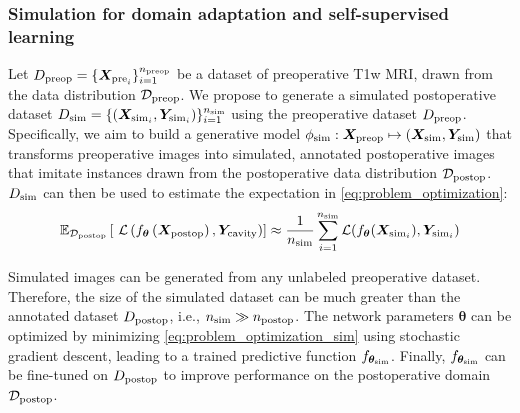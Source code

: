 \subsubsection{Simulation for domain adaptation and self-supervised learning}
\label{sec:sim_res_self}

Let $D_{\textnormal{preop}} = \{ \bm{X}_{\text{pre}_i} \}_{i = 1}^{n_{\textnormal{preop}}}$ be a dataset of preoperative \ac{T1w} \ac{MRI}, drawn from the data distribution $\mathcal{D}_{\textnormal{preop}}$.
We propose to generate a simulated postoperative dataset $D_{\textnormal{sim}} = \{ (\bm{X}_{\text{sim}_i}, \bm{Y}_{\text{sim}_i}) \}_{i = 1}^{n_{\textnormal{sim}}}$ using the preoperative dataset $D_{\textnormal{preop}}$.
Specifically, we aim to build a generative model $\phi_{\textnormal{sim}} : \bm{X}_{\textnormal{preop}} \mapsto (\bm{X}_{\textnormal{sim}}, \bm{Y}_{\textnormal{sim}})$ that transforms preoperative images into simulated, annotated postoperative images that imitate instances drawn from the postoperative data distribution $\mathcal{D}_{\textnormal{postop}}$.
$D_{\textnormal{sim}}$ can then be used to estimate the expectation in \cref{eq:problem_optimization}:
\begin{equation}
  \mathbb{E}_{\mathcal{D}_{\textnormal{postop}}} \left[\
    \mathcal{L}\left(
      f_{\bm{\theta}} \left(\bm{X}_{\textnormal{postop}} \right), \bm{Y}_{\textnormal{cavity}} \right)
    \right]
    \approx \frac{1}{n_{\textnormal{sim}}}\sum_{i=1}^{n_{\textnormal{sim}}} \mathcal{L}(f_{\bm{\theta}}(\bm{X}_{\text{sim}_i}),  \bm{Y}_{\text{sim}_i})
  \label{eq:problem_optimization_sim}
\end{equation}

Simulated images can be generated from any unlabeled preoperative dataset.
Therefore, the size of the simulated dataset can be much greater than the annotated dataset $D_{\textnormal{postop}}$, i.e., $n_{\textnormal{sim}}\gg n_{\textnormal{postop}}$.
The network parameters $\bm{\theta}$ can be optimized by minimizing \cref{eq:problem_optimization_sim} using stochastic gradient descent, leading to a trained predictive function $f_{\bm{\theta_}{\text{sim}}}$.
Finally, $f_{\bm{\theta_}{\text{sim}}}$ can be fine-tuned on $D_{\textnormal{postop}}$ to improve performance on the postoperative domain $\mathcal{D}_{\textnormal{postop}}$.
